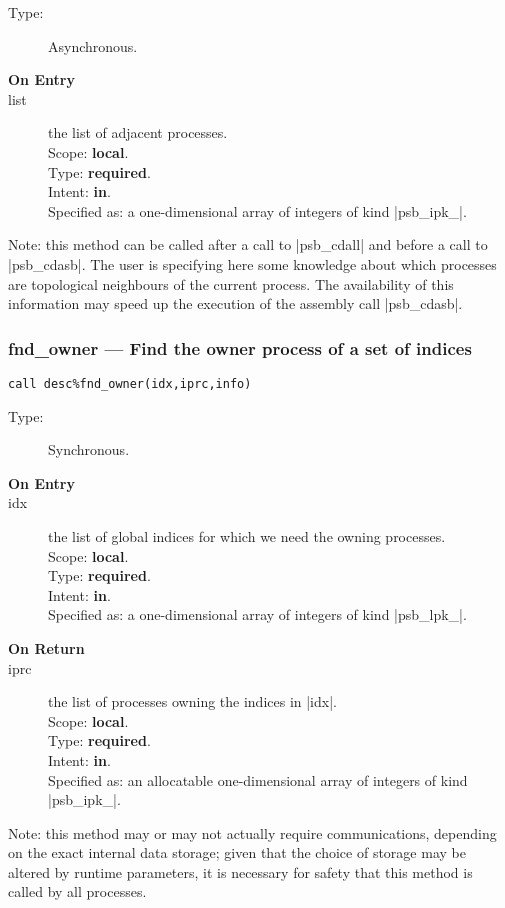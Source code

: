 \begin{description}
\item[Type:] Asynchronous.
\item[\bf On Entry]
\item[list] the list of adjacent processes.\\
Scope: {\bf local}.\\
Type: {\bf required}.\\
Intent: {\bf in}.\\
Specified as: a one-dimensional array of integers of kind \fortinline|psb_ipk_|. 
\end{description}
Note: this method can be called after a call  to \fortinline|psb_cdall| and
before a call to \fortinline|psb_cdasb|. The user is specifying here some
knowledge about which processes are topological neighbours of the
current process. The availability of this information may speed up the
execution of the assembly call \fortinline|psb_cdasb|. 


\subsubsection{fnd\_owner --- Find the owner process of a set of indices}

\begin{verbatim}
call desc%fnd_owner(idx,iprc,info)
\end{verbatim}

\begin{description}
\item[Type:] Synchronous.
\item[\bf On Entry]
\item[idx] the list of global indices for which we need the owning processes.\\
Scope: {\bf local}.\\
Type: {\bf required}.\\
Intent: {\bf in}.\\
Specified as: a one-dimensional array of integers of kind \fortinline|psb_lpk_|. 
\item[\bf On Return]
\item[iprc] the list of processes owning the indices in \fortinline|idx|.\\
Scope: {\bf local}.\\
Type: {\bf required}.\\
Intent: {\bf in}.\\
Specified as: an allocatable one-dimensional array of integers of kind \fortinline|psb_ipk_|. 
\end{description}
Note: this method may or may not actually require communications, depending on
the exact internal data storage; given that the choice of storage may
be altered by runtime parameters, it is necessary for safety that this
method is called by all processes. 




